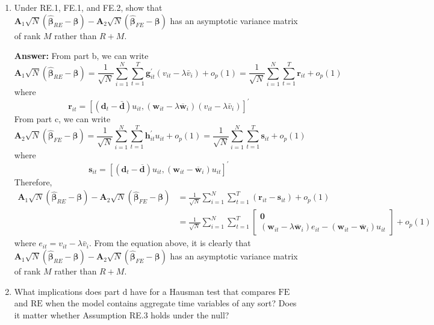\begin{enumerate}
\begin{enumerate}
        \item Under RE.1, FE.1, and FE.2, show that $\mathbf{A}_{1} \sqrt{N}\left(\hat{\boldsymbol{\beta}}_{R E}-\boldsymbol{\beta}\right)-\mathbf{A}_{2} \sqrt{N}\left(\hat{\boldsymbol{\beta}}_{F E}-\boldsymbol{\beta}\right)$ has an asymptotic variance matrix of rank $M$ rather than $R+M$.
        
        \textbf{Answer:} From part b, we can write
        \[ \mathbf{A}_1\sqrt{N}\left( \hat{\bm{\beta}}_{RE} - \bm{\beta} \right) = \frac{1}{\sqrt{N}}\sum_{i=1}^N \sum_{t=1}^T \mathbf{g}_{it}^\prime (v_{i t}-\lambda \bar{v}_{i}) + o_p(1) = \frac{1}{\sqrt{N}}\sum_{i=1}^N \sum_{t=1}^T \mathbf{r}_{it} + o_p(1) \]
        where 
        \[ \mathbf{r}_{i t}=\left[\left(\mathbf{d}_{t}-\bar{\mathbf{d}}\right) u_{i t},\left(\mathbf{w}_{i t}-\lambda \overline{\mathbf{w}}_{i}\right)\left(v_{i t}-\lambda \bar{v}_{i}\right)\right]^{\prime} \]
        From part c, we can write
        \[ \mathbf{A}_2\sqrt{N}\left( \hat{\bm{\beta}}_{FE} - \bm{\beta} \right) = \frac{1}{\sqrt{N}}\sum_{i=1}^N \sum_{t=1}^T \mathbf{h}_{it}^\prime u_{it} + o_p(1) = \frac{1}{\sqrt{N}}\sum_{i=1}^N \sum_{t=1}^T \mathbf{s}_{it} + o_p(1) \]
        where
        \[ \mathbf{s}_{i t}=\left[\left(\mathbf{d}_{t}-\overline{\mathbf{d}}\right) u_{i t},\left(\mathbf{w}_{i t}-\overline{\mathbf{w}}_{i}\right) u_{i t}\right]^{\prime} \]
        Therefore,
        \begin{align*}
            \mathbf{A}_1\sqrt{N}\left( \hat{\bm{\beta}}_{RE} - \bm{\beta} \right) - \mathbf{A}_2\sqrt{N}\left( \hat{\bm{\beta}}_{FE} - \bm{\beta} \right) &= \frac{1}{\sqrt{N}}\sum_{i=1}^N \sum_{t=1}^T (\mathbf{r}_{it} - \mathbf{s}_{it}) + o_p(1) \\
            &= \frac{1}{\sqrt{N}}\sum_{i=1}^N \sum_{t=1}^T \begin{bmatrix} \mathbf{0} \\ \left(\mathbf{w}_{i t}-\lambda \overline{\mathbf{w}}_{i}\right) e_{it} - \left(\mathbf{w}_{i t}-\overline{\mathbf{w}}_{i}\right) u_{it} \end{bmatrix} + o_p(1)
        \end{align*}
        where $e_{it} = v_{i t}-\lambda \bar{v}_{i}$. From the equation above, it is clearly that $\mathbf{A}_{1} \sqrt{N}\left(\hat{\boldsymbol{\beta}}_{R E}-\boldsymbol{\beta}\right)-\mathbf{A}_{2} \sqrt{N}\left(\hat{\boldsymbol{\beta}}_{F E}-\boldsymbol{\beta}\right)$ has an asymptotic variance matrix of rank $M$ rather than $R+M$.
        
        \item What implications does part d have for a Hausman test that compares $\mathrm{FE}$ and $\mathrm{RE}$ when the model contains aggregate time variables of any sort? Does it matter whether Assumption RE.3 holds under the null?
        

\end{enumerate}
\end{enumerate}
